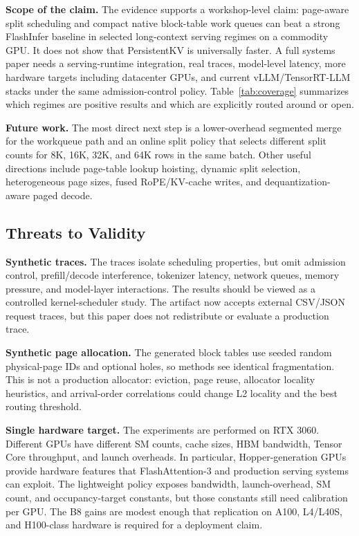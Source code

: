 \documentclass[10pt]{article}
\begin{document}
\textbf{Scope of the claim.} The evidence supports a workshop-level claim:
page-aware split scheduling and compact native block-table work queues can beat
a strong FlashInfer baseline in selected long-context serving regimes on a
commodity GPU. It does not show that PersistentKV is universally faster. A full
systems paper needs a serving-runtime integration, real traces, model-level
latency, more hardware targets including datacenter GPUs, and current
vLLM/TensorRT-LLM stacks under the same admission-control policy.
Table~\ref{tab:coverage} summarizes which regimes are positive results and
which are explicitly routed around or open.

\textbf{Future work.} The most direct next step is a lower-overhead segmented
merge for the workqueue path and an online split policy that selects different
split counts for 8K, 16K, 32K, and 64K rows in the same batch. Other useful
directions include page-table lookup hoisting, dynamic split selection,
heterogeneous page sizes, fused RoPE/KV-cache writes, and dequantization-aware
paged decode.

\subsection{Threats to Validity}

\textbf{Synthetic traces.} The traces isolate scheduling properties, but omit
admission control, prefill/decode interference, tokenizer latency, network
queues, memory pressure, and model-layer interactions. The results should be
viewed as a controlled kernel-scheduler study. The artifact now accepts
external CSV/JSON request traces, but this paper does not redistribute or
evaluate a production trace.

\textbf{Synthetic page allocation.} The generated block tables use seeded
random physical-page IDs and optional holes, so methods see identical
fragmentation. This is not a production allocator: eviction, page reuse,
allocator locality heuristics, and arrival-order correlations could change L2
locality and the best routing threshold.

\textbf{Single hardware target.} The experiments are performed on RTX 3060.
Different GPUs have different SM counts, cache sizes, HBM bandwidth, Tensor
Core throughput, and launch overheads. In particular, Hopper-generation GPUs
provide hardware features that FlashAttention-3 and production serving systems
can exploit. The lightweight policy exposes bandwidth, launch-overhead, SM
count, and occupancy-target constants, but those constants still need
calibration per GPU. The B8 gains are modest enough that replication on A100,
L4/L40S, and H100-class hardware is required for a deployment claim.
\end{document}

